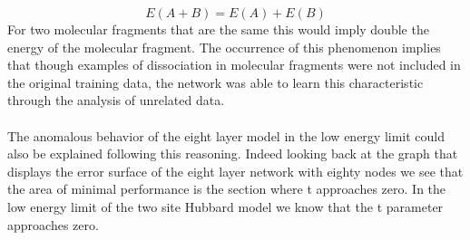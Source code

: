 \documentclass[]{article}
\begin{document}
\begin{equation*}
E\left(A+B\right)=E\left(A\right)+E\left(B\right)
\end{equation*} 
For two molecular fragments that are the same this would imply double the energy of the molecular fragment. The occurrence of this phenomenon implies that though examples of dissociation in molecular fragments were not included in the original training data, the network was able to learn this characteristic through the analysis of unrelated data.
\\
\\
The anomalous behavior of the eight layer model in the low energy limit could also be explained following this reasoning. Indeed looking back at the graph that displays the error surface of the eight layer network with eighty nodes we see that the area of minimal performance is the section where t approaches zero. In the low energy limit of the two site Hubbard model we know that the t parameter approaches zero. 
\end{document}
